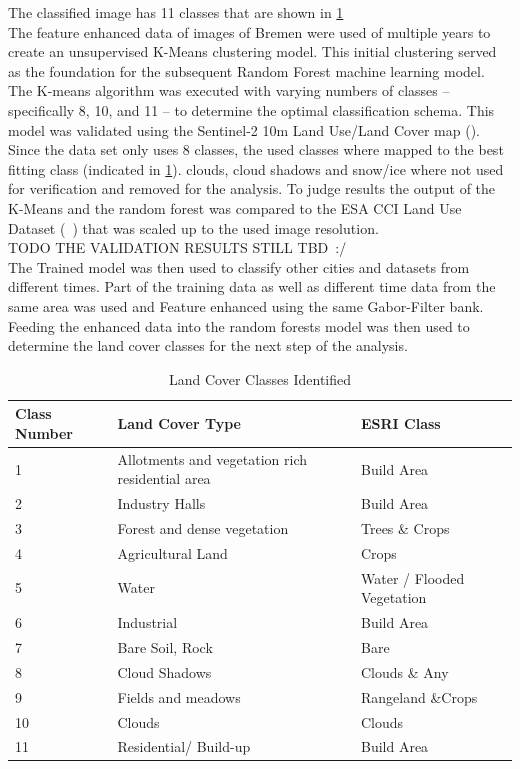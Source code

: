 \documentclass[12pt,a4paper, english]{article}
\begin{document}
      The classified image has 11 classes that are shown in \cref{tab:land_cover_classes}
      \\
      The feature enhanced data of images of Bremen%
      were used of multiple years to create an unsupervised K-Means clustering model.%
      This initial clustering served as the foundation for the subsequent Random Forest machine learning model.
      The K-means algorithm was executed with varying numbers of classes – specifically 8, 10, and 11 – to determine the optimal classification schema.
      This model was validated using the Sentinel-2 10m Land Use/Land Cover map (\autocite{Zhang}).
      Since the data set only uses 8 classes, the used classes where mapped to the best fitting class (indicated in \cref{tab:land_cover_classes}). 
      clouds, cloud shadows and snow/ice where not used for verification and removed for the analysis.
      To judge results the output of the K-Means and the random forest was compared to the ESA CCI Land Use Dataset (~\autocite{landformclassicationusingfuzzykmeans2000}) that was scaled up to the used image resolution. %
      \\
      TODO THE VALIDATION RESULTS STILL TBD~:/%
      \\ 
      The Trained model was then used to classify other cities and datasets from different times. 
      Part of the training data as well as different time data from the same area was used and Feature enhanced using the same Gabor-Filter bank.
      Feeding the enhanced data into the random forests model was then used to determine the land cover classes for the next step of the analysis.
      \begin{table}[ht]
      \centering
      \renewcommand{\arraystretch}{1.4}
      \caption{Land Cover Classes Identified\label{tab:land_cover_classes}}
      \begin{tabular}{p{0.5cm}p{4cm}l}
      \toprule
      \textbf{Class Number} & \textbf{Land Cover Type} & \textbf{ESRI Class}\\
      \midrule
      1 &  Allotments and vegetation rich residential area  & Build Area\\
      2 &  Industry Halls & Build Area\\
      3 &  Forest and dense vegetation& Trees \& Crops\\
      4 &  Agricultural Land & Crops\\
      5 &  Water& Water / Flooded Vegetation\\
      6 &  Industrial& Build Area\\
      7 &  Bare Soil, Rock & Bare \\
      8 &  Cloud Shadows & Clouds \& Any \\
      9 &  Fields and meadows& Rangeland \&Crops \\
      10 &  Clouds & Clouds \\
      11 &  Residential/ Build-up& Build Area\\
      \bottomrule
      \end{tabular}
      \end{table}
\end{document}
